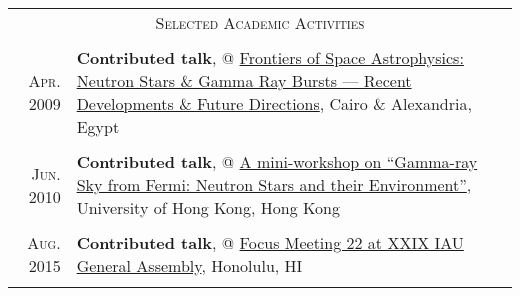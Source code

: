 \documentclass[letterpaper,10pt]{article}
\begin{document}
\begin{longtable}{r|p{5.5in}}

    \multicolumn{2}{c}{\textsc{Selected Academic Activities}}  \\
    \multicolumn{2}{c}{} \\

    \textsc{Apr. 2009}   &   \textbf{Contributed talk}, @ \href{http://www.ns-grb.com/index0.html}{Frontiers of Space Astrophysics: Neutron Stars \& Gamma Ray Bursts --- Recent Developments \& Future Directions}, Cairo \& Alexandria, Egypt     \\
    \multicolumn{2}{c}{} \\

    \textsc{Jun. 2010}   &   \textbf{Contributed talk}, @ \href{http://www.physics.hku.hk/~astro/2010Astro/Index.htm}{A mini-workshop on ``Gamma-ray Sky from Fermi: Neutron Stars and their Environment''}, University of Hong Kong, Hong Kong   \\
    \multicolumn{2}{c}{} \\



    \textsc{Aug. 2015}   &   \textbf{Contributed talk}, @ \href{http://hffiau.epfl.ch/page-116896.html}{Focus Meeting 22 at XXIX IAU
General Assembly}, Honolulu, HI     \\
    \multicolumn{2}{c}{} \\


\end{longtable}
\end{document}
